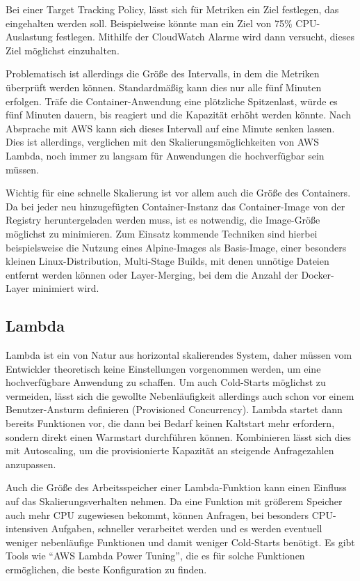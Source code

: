 Bei einer Target Tracking Policy, lässt sich für Metriken ein Ziel festlegen, das eingehalten werden soll. Beispielweise könnte man ein Ziel von 75\% CPU-Auslastung festlegen. Mithilfe der CloudWatch Alarme wird dann versucht, dieses Ziel möglichst einzuhalten. 

Problematisch ist allerdings die Größe des Intervalls, in dem die Metriken überprüft werden können. Standardmäßig kann dies nur alle fünf Minuten erfolgen. Träfe die Container-Anwendung eine plötzliche Spitzenlast, würde es fünf Minuten dauern, bis reagiert und die Kapazität erhöht werden könnte. Nach Absprache mit AWS kann sich dieses Intervall auf eine Minute senken lassen. Dies ist allerdings, verglichen mit den Skalierungsmöglichkeiten von AWS Lambda, noch immer zu langsam für Anwendungen die hochverfügbar sein müssen.

Wichtig für eine schnelle Skalierung ist vor allem auch die Größe des Containers. Da bei jeder neu hinzugefügten Container-Instanz das Container-Image von der Registry heruntergeladen werden muss, ist es notwendig, die Image-Größe möglichst zu minimieren. Zum Einsatz kommende Techniken sind hierbei beispielsweise die Nutzung eines Alpine-Images als Basis-Image, einer besonders kleinen Linux-Distribution, Multi-Stage Builds, mit denen unnötige Dateien entfernt werden können oder Layer-Merging, bei dem die Anzahl der Docker-Layer minimiert wird.


\subsection{Lambda}
\label{subsec:skalierung-lambda}
Lambda ist ein von Natur aus horizontal skalierendes System, daher müssen vom Entwickler theoretisch keine Einstellungen vorgenommen werden, um eine hochverfügbare Anwendung zu schaffen. Um auch Cold-Starts möglichst zu vermeiden, lässt sich die gewollte Nebenläufigkeit allerdings auch schon vor einem Benutzer-Ansturm definieren (Provisioned Concurrency). Lambda startet dann bereits Funktionen vor, die dann bei Bedarf keinen Kaltstart mehr erfordern, sondern direkt einen Warmstart durchführen können. Kombinieren lässt sich dies mit Autoscaling, um die provisionierte Kapazität an steigende Anfragezahlen anzupassen. 

Auch die Größe des Arbeitsspeicher einer Lambda-Funktion kann einen Einfluss auf das Skalierungsverhalten nehmen. Da eine Funktion mit größerem Speicher auch mehr CPU zugewiesen bekommt, können Anfragen, bei besonders CPU-intensiven Aufgaben, schneller verarbeitet werden und es werden eventuell weniger nebenläufige Funktionen und damit weniger Cold-Starts benötigt. Es gibt Tools wie "`AWS Lambda Power Tuning"'\cite{casalboni_alexcasalboniaws-lambda-power-tuning_2021}, die es für solche Funktionen ermöglichen, die beste Konfiguration zu finden.

